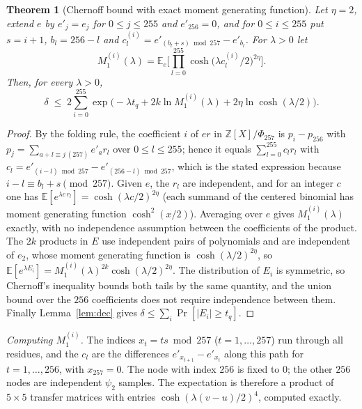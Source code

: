\documentclass[11pt]{article}
\newtheorem{theorem}{Theorem}
\theoremstyle{remark}
\newcommand{\Z}{\mathbb{Z}}
\begin{document}
\begin{theorem}[Chernoff bound with exact moment generating function]\label{thm:chernoff}
Let $\eta=2$, extend $e$ by $e'_j=e_j$ for $0\le j\le255$ and $e'_{256}=0$, and for $0\le i\le255$ put $s=i+1$, $b_l=256-l$ and $c^{(i)}_l=e'_{(b_l+s)\bmod257}-e'_{b_l}$. For $\lambda>0$ let
\[
M_1^{(i)}(\lambda)=\mathbb E_e\Big[\prod_{l=0}^{255}\cosh\!\big(\lambda c^{(i)}_l/2\big)^{2\eta}\Big].
\]
Then, for every $\lambda>0$,
\[
\delta\;\le\;2\sum_{i=0}^{255}\exp\!\Big(-\lambda t_q+2k\ln M_1^{(i)}(\lambda)+2\eta\ln\cosh(\lambda/2)\Big).
\]
\end{theorem}
\begin{proof}
By the folding rule, the coefficient $i$ of $er$ in $\Z[X]/\Phi_{257}$ is $p_i-p_{256}$ with $p_j=\sum_{a+l\equiv j\,(257)}e'_ar_l$ over $0\le l\le255$; hence it equals $\sum_{l=0}^{255}c_lr_l$ with $c_l=e'_{(i-l)\bmod257}-e'_{(256-l)\bmod257}$, which is the stated expression because $i-l\equiv b_l+s\pmod{257}$. Given $e$, the $r_l$ are independent, and for an integer $c$ one has $\mathbb E[e^{\lambda c\,r_l}]=\cosh(\lambda c/2)^{2\eta}$ (each summand of the centered binomial has moment generating function $\cosh^2(x/2)$). Averaging over $e$ gives $M_1^{(i)}(\lambda)$ exactly, with no independence assumption between the coefficients of the product. The $2k$ products in $E$ use independent pairs of polynomials and are independent of $e_2$, whose moment generating function is $\cosh(\lambda/2)^{2\eta}$, so $\mathbb E[e^{\lambda E_i}]=M_1^{(i)}(\lambda)^{2k}\cosh(\lambda/2)^{2\eta}$. The distribution of $E_i$ is symmetric, so Chernoff's inequality bounds both tails by the same quantity, and the union bound over the $256$ coefficients does not require independence between them. Finally Lemma~\ref{lem:dec} gives $\delta\le\sum_i\Pr[|E_i|\ge t_q]$.
\end{proof}
\noindent \emph{Computing $M_1^{(i)}$.} The indices $x_t=ts\bmod257$ ($t=1,\dots,257$) run through all residues, and the $c_l$ are the differences $e'_{x_{t+1}}-e'_{x_t}$ along this path for $t=1,\dots,256$, with $x_{257}=0$. The node with index $256$ is fixed to $0$; the other $256$ nodes are independent $\psi_2$ samples. The expectation is therefore a product of $5\times5$ transfer matrices with entries $\cosh(\lambda(v-u)/2)^4$, computed exactly.
\end{document}
